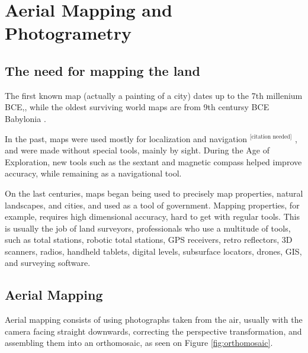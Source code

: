 

\chapter{Aerial Mapping and Photogrametry} \label{chap:AerialMapping}



\section{The need for mapping the land}
The first known map (actually a painting of a city) dates up to the 7th millenium BCE,\cite{map1}, while the oldest surviving world maps are from 9th centursy BCE Babylonia\cite{map2}	.

In the past, maps were used mostly for localization and navigation $^{\text{[citation needed]}}$ , and were made without special tools, mainly by sight. During the Age of Exploration, new tools such as the sextant and magnetic compass helped improve accuracy, while remaining as a navigational tool.

On the last centuries, maps began being used to precisely map properties, natural landscapes, and cities, and used as a tool of government\cite{mapgovernment}. Mapping properties, for example, requires high dimensional accuracy, hard to get with regular tools. This is usually the job of land surveyors, professionals who use a multitude of tools, such as total stations, robotic total stations, GPS receivers, retro reflectors, 3D scanners, radios, handheld tablets, digital levels, subsurface locators, drones, GIS, and surveying software.


\section{Aerial Mapping}
Aerial mapping consists of using photographs taken from the air, usually with the camera facing straight downwards, correcting the perspective transformation, and assembling them into an orthomosaic, as seen on Figure \ref{fig:orthomosaic}.

